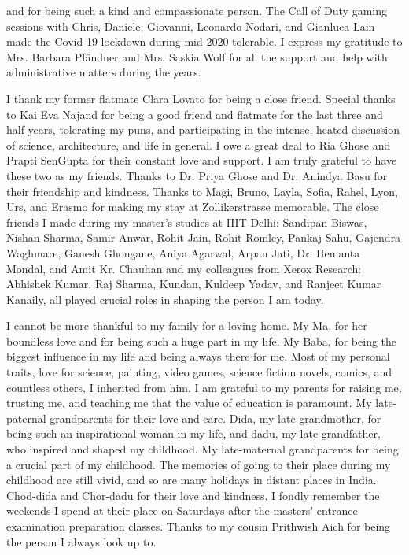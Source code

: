 and for being such a kind and compassionate person. The Call of Duty gaming sessions with Chris, Daniele, Giovanni, Leonardo Nodari, and Gianluca Lain made the Covid-19 lockdown during mid-2020 tolerable. I express my gratitude to Mrs. Barbara Pf\"andner and Mrs. Saskia Wolf for all the support and help with administrative matters during the years. 


I thank my former flatmate Clara Lovato for being a close friend. Special thanks to Kai Eva Najand for being a good friend and flatmate for the last three and half years, tolerating my puns, and participating in the intense, heated discussion of science, architecture, and life in general. I owe a great deal to Ria Ghose and Prapti SenGupta for their constant love and support. I am truly grateful to have these two as my friends. Thanks to Dr. Priya Ghose and Dr. Anindya Basu for their friendship and kindness. Thanks to Magi, Bruno, Layla, Sofia, Rahel, Lyon, Urs, and Erasmo for making my stay at Zollikerstrasse memorable. The close friends I made during my master's studies at IIIT-Delhi: Sandipan Biswas, Nishan Sharma, Samir Anwar, Rohit Jain, Rohit Romley, Pankaj Sahu, Gajendra Waghmare, Ganesh Ghongane, Aniya Agarwal, Arpan Jati, Dr. Hemanta Mondal, and Amit Kr. Chauhan and my colleagues from Xerox Research: Abhishek Kumar, Raj Sharma, Kundan, Kuldeep Yadav, and Ranjeet Kumar Kanaily, all played crucial roles in shaping the person I am today.


I cannot be more thankful to my family for a loving home. My Ma, for her boundless love and for being such a huge part in my life. My Baba, for being the biggest influence in my life and being always there for me. Most of my personal traits, love for science, painting, video games, science fiction novels, comics, and countless others, I inherited from him. I am grateful to my parents for raising me, trusting me, and teaching me that the value of education is paramount. My late-paternal grandparents for their love and care. Dida, my late-grandmother, for being such an inspirational woman in my life, and dadu, my late-grandfather, who inspired and shaped my childhood. My late-maternal grandparents for being a crucial part of my childhood. The memories of going to their place during my childhood are still vivid, and so are many holidays in distant places in India. Chod-dida and Chor-dadu for their love and kindness. I fondly remember the weekends I spend at their place on Saturdays after the masters' entrance examination preparation classes. Thanks to my cousin Prithwish Aich for being the person I always look up to.

